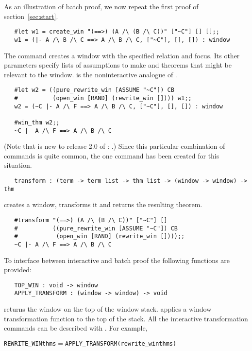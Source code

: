 As an illustration of batch proof, we now repeat the first proof of
section~\ref{sec:start}.
\setcounter{sessioncount}{1}
\begin{session}\begin{verbatim}
   #let w1 = create_win "(==>) (A /\ (B /\ C))" ["~C"] [] [];;
   w1 = (|- A /\ B /\ C ==> A /\ B /\ C, ["~C"], [], []) : window
\end{verbatim}\end{session}
The  command creates a window with the specified 
relation and focus.   Its other parameters specify lists of assumptions
to make and theorems that might be relevant to the window.
 is the noninteractive analogue of .
\begin{session}\begin{verbatim}
   #let w2 = ((pure_rewrite_win [ASSUME "~C"]) CB
   #          (open_win [RAND] (rewrite_win []))) w1;;
   w2 = (~C |- A /\ F ==> A /\ B /\ C, ["~C"], [], []) : window
   
   #win_thm w2;;
   ~C |- A /\ F ==> A /\ B /\ C
\end{verbatim}\end{session}
(Note that  is new to release 2.0 of \HOL:
.)
Since this particular combination of commands is quite common,
the one command  has been created for this situation.
\begin{boxed}\begin{verbatim}
   transform : (term -> term list -> thm list -> (window -> window) -> thm
\end{verbatim}\end{boxed}
 creates a window, transforms it and returns the resulting
theorem.
\setcounter{sessioncount}{1}
\begin{session}\begin{verbatim}
   #transform "(==>) (A /\ (B /\ C))" ["~C"] []
   #          ((pure_rewrite_win [ASSUME "~C"]) CB
   #           (open_win [RAND] (rewrite_win [])));;
   ~C |- A /\ F ==> A /\ B /\ C
\end{verbatim}\end{session}

To interface between interactive and batch proof the following
functions are provided:
\begin{boxed}\begin{verbatim}
   TOP_WIN : void -> window
   APPLY_TRANSFORM : (window -> window) -> void
\end{verbatim}\end{boxed}
 returns the window on the top of the window stack.
 applies a window transformation function to the top of
the stack.
All the interactive transformation commands can be described with
.
For example,
\begin{alltt}
   REWRITE_WIN thms \(=\) APPLY_TRANSFORM (rewrite_win thms)
\end{alltt}

